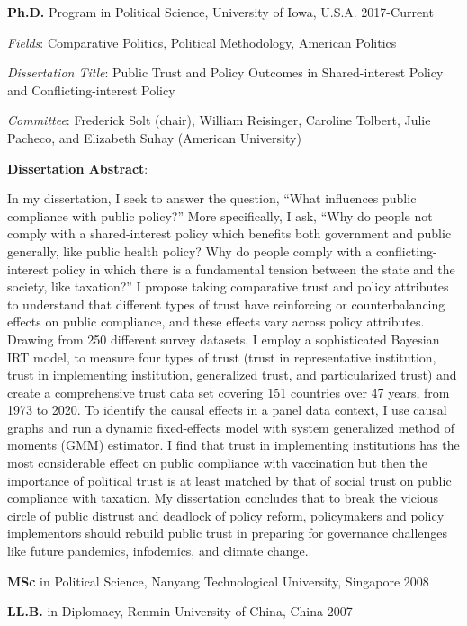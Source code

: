\documentclass[10.5pt,]{article}
\providecommand{\tightlist}{%
	\setlength{\itemsep}{0pt}\setlength{\parskip}{0pt}}
\renewenvironment{itemize}{
	\begin{list}{}{
			\setlength{\leftmargin}{1.5em}
		}
	}{
	\end{list}
}
\begin{document}
 \begin{itemize}
 \tightlist
 \item
   \textbf{Ph.D.} Program in Political Science, University of Iowa,
   U.S.A. \hfill 2017-Current

   \begin{itemize}
   \tightlist
   \item
     \emph{Fields}: Comparative Politics, Political Methodology,
     American Politics
   \item
     \emph{Dissertation Title}: Public Trust and Policy Outcomes in
     Shared-interest Policy and Conflicting-interest Policy
   \item
     \emph{Committee}: Frederick Solt (chair), William Reisinger,
     Caroline Tolbert, Julie Pacheco, and Elizabeth Suhay (American
     University)
   \end{itemize}
 \item
   \textbf{Dissertation Abstract}:

   \begin{itemize}
   \tightlist
   \item
     In my dissertation, I seek to answer the question, ``What
     influences public compliance with public policy?'' More
     specifically, I ask, ``Why do people not comply with a
     shared-interest policy which benefits both government and public
     generally, like public health policy? Why do people comply with a
     conflicting-interest policy in which there is a fundamental tension
     between the state and the society, like taxation?'' I propose
     taking comparative trust and policy attributes to understand that
     different types of trust have reinforcing or counterbalancing
     effects on public compliance, and these effects vary across policy
     attributes. Drawing from 250 different survey datasets, I employ a
     sophisticated Bayesian IRT model, to measure four types of trust
     (trust in representative institution, trust in implementing
     institution, generalized trust, and particularized trust) and
     create a comprehensive trust data set covering 151 countries over
     47 years, from 1973 to 2020. To identify the causal effects in a
     panel data context, I use causal graphs and run a dynamic
     fixed-effects model with system generalized method of moments (GMM)
     estimator. I find that trust in implementing institutions has the
     most considerable effect on public compliance with vaccination but
     then the importance of political trust is at least matched by that
     of social trust on public compliance with taxation. My dissertation
     concludes that to break the vicious circle of public distrust and
     deadlock of policy reform, policymakers and policy implementors
     should rebuild public trust in preparing for governance challenges
     like future pandemics, infodemics, and climate change.
   \end{itemize}
 \item
   \textbf{MSc} in Political Science, Nanyang Technological University,
   Singapore \hfill 2008
 \item
   \textbf{LL.B.} in Diplomacy, Renmin University of China, China
   \hfill 2007
 \end{itemize}
\end{document}
